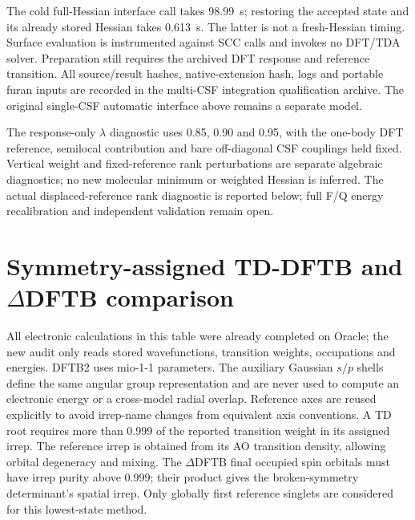\documentclass[11pt,a4paper]{article}
\begin{document}
The cold full-Hessian interface call takes 98.99~s; restoring the accepted state and its already stored Hessian takes 0.613~s. The latter is not a fresh-Hessian timing. Surface evaluation is instrumented against SCC calls and invokes no DFT/TDA solver. Preparation still requires the archived DFT response and reference transition. All source/result hashes, native-extension hash, logs and portable furan inputs are recorded in the multi-CSF integration qualification archive. The original single-CSF automatic interface above remains a separate model.

The response-only $\lambda$ diagnostic uses 0.85, 0.90 and 0.95, with the one-body DFT reference, semilocal contribution and bare off-diagonal CSF couplings held fixed. Vertical weight and fixed-reference rank perturbations are separate algebraic diagnostics; no new molecular minimum or weighted Hessian is inferred. The actual displaced-reference rank diagnostic is reported below; full F/Q energy recalibration and independent validation remain open.

\section{Symmetry-assigned TD-DFTB and \texorpdfstring{$\Delta$}{Delta}DFTB comparison}
All electronic calculations in this table were already completed on Oracle; the new audit only reads stored wavefunctions, transition weights, occupations and energies. DFTB2 uses mio-1-1 parameters. The auxiliary Gaussian $s/p$ shells define the same angular group representation and are never used to compute an electronic energy or a cross-model radial overlap. Reference axes are reused explicitly to avoid irrep-name changes from equivalent axis conventions. A TD root requires more than 0.999 of the reported transition weight in its assigned irrep. The reference irrep is obtained from its AO transition density, allowing orbital degeneracy and mixing. The $\Delta$DFTB final occupied spin orbitals must have irrep purity above 0.999; their product gives the broken-symmetry determinant's spatial irrep. Only globally first reference singlets are considered for this lowest-state method.
\end{document}
